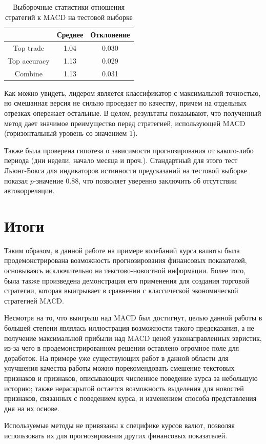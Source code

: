 \documentclass[14pt,a4paper]{extreport}
\begin{document}
\begin{table}[h]
\centering 
\begin{tabular}{| c | c | c |}
\hline
 & Среднее & Отклонение \\ \hline
Top trade & 1.04 & 0.030 \\ \hline
Top accuracy & 1.13 & 0.029 \\ \hline
Combine & 1.13 & 0.031 \\ \hline
\end{tabular}
\caption{Выборочные статистики отношения стратегий к MACD на тестовой выборке\label{test_table_compare}}
\end{table}

Как можно увидеть, лидером является классификатор с максимальной точностью, но смешанная версия не сильно проседает по качеству,
причем на отдельных отрезках опережает остальные. В целом, результаты показывают, что полученный метод дает значимое преимущество перед стратегией, использующей MACD (горизонтальный уровень со значением 1).	

Также была проверена гипотеза о зависимости прогнозирования от какого-либо периода (дни недели, начало месяца и проч.).
Стандартный для этого тест Льюнг-Бокса\cite{ljungbox} для индикаторов истинности предсказаний на тестовой выборке
показал $p$-значение 0.88, что позволяет уверенно заключить об отсутствии автокорреляции.

\chapter{Итоги}

Таким образом, в данной работе на примере колебаний курса
валюты была продемонстрирована возможность прогнозирования финансовых показателей, основываясь исключительно на текстово-новостной информации.
Более того, была также произведена демонстрация его применения для создания торговой стратегии,
которая выигрывает в сравнении с классической экономической стратегией MACD.

Несмотря на то, что выигрыш над MACD был достигнут, целью данной работы в большей степени являлась иллюстрация
возможности такого предсказания, а не получение максимальной прибыли над MACD ценой узконаправленных эвристик,
из-за чего в продемонстрированном решении оставлено огромное поле для доработок.
На примере уже существующих работ в данной области для улучшения качества работы можно порекомендовать
смешение текстовых признаков и признаков, описывающих численное поведение курса за небольшую историю;
также нераскрытой остается возможность выделения для новостей признаков, связанных с поведением курса, и изменением
способа представления дня на их основе.

Используемые методы не привязаны к специфике курсов валют, позволяя использовать их для прогнозирования других
финансовых показателей.

{}

\end{document}
